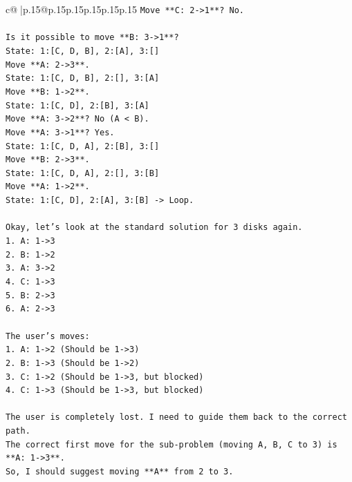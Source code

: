\documentclass{article}
\begin{document}
{\begin{supertabular}{c@{$\;$}|p{.15\linewidth}@{}p{.15\linewidth}p{.15\linewidth}p{.15\linewidth}p{.15\linewidth}p{.15\linewidth}}
{{{\texttt{Move **C: 2{-}>1**? No.} \\
\\ 
\texttt{Is it possible to move **B: 3{-}>1**?} \\
\texttt{State: 1:{[}C, D, B{]}, 2:{[}A{]}, 3:{[}{]}} \\
\texttt{Move **A: 2{-}>3**.} \\
\texttt{State: 1:{[}C, D, B{]}, 2:{[}{]}, 3:{[}A{]}} \\
\texttt{Move **B: 1{-}>2**.} \\
\texttt{State: 1:{[}C, D{]}, 2:{[}B{]}, 3:{[}A{]}} \\
\texttt{Move **A: 3{-}>2**? No (A < B).} \\
\texttt{Move **A: 3{-}>1**? Yes.} \\
\texttt{State: 1:{[}C, D, A{]}, 2:{[}B{]}, 3:{[}{]}} \\
\texttt{Move **B: 2{-}>3**.} \\
\texttt{State: 1:{[}C, D, A{]}, 2:{[}{]}, 3:{[}B{]}} \\
\texttt{Move **A: 1{-}>2**.} \\
\texttt{State: 1:{[}C, D{]}, 2:{[}A{]}, 3:{[}B{]} {-}> Loop.} \\
\\ 
\texttt{Okay, let's look at the standard solution for 3 disks again.} \\
\texttt{1. A: 1{-}>3} \\
\texttt{2. B: 1{-}>2} \\
\texttt{3. A: 3{-}>2} \\
\texttt{4. C: 1{-}>3} \\
\texttt{5. B: 2{-}>3} \\
\texttt{6. A: 2{-}>3} \\
\\ 
\texttt{The user's moves:} \\
\texttt{1. A: 1{-}>2 (Should be 1{-}>3)} \\
\texttt{2. B: 1{-}>3 (Should be 1{-}>2)} \\
\texttt{3. C: 1{-}>2 (Should be 1{-}>3, but blocked)} \\
\texttt{4. C: 1{-}>3 (Should be 1{-}>3, but blocked)} \\
\\ 
\texttt{The user is completely lost. I need to guide them back to the correct path.} \\
\texttt{The correct first move for the sub{-}problem (moving A, B, C to 3) is **A: 1{-}>3**.} \\
\texttt{So, I should suggest moving **A** from 2 to 3.} \\
}}}
\end{supertabular}}
\end{document}
